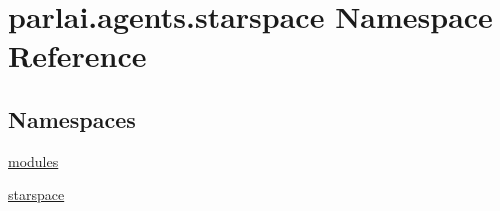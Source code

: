 \hypertarget{namespaceparlai_1_1agents_1_1starspace}{}\section{parlai.\+agents.\+starspace Namespace Reference}
\label{namespaceparlai_1_1agents_1_1starspace}
\subsection*{Namespaces}
\begin{DoxyCompactItemize}
\item 
 \hyperlink{namespaceparlai_1_1agents_1_1starspace_1_1modules}{modules}
\item 
 \hyperlink{namespaceparlai_1_1agents_1_1starspace_1_1starspace}{starspace}
\end{DoxyCompactItemize}
